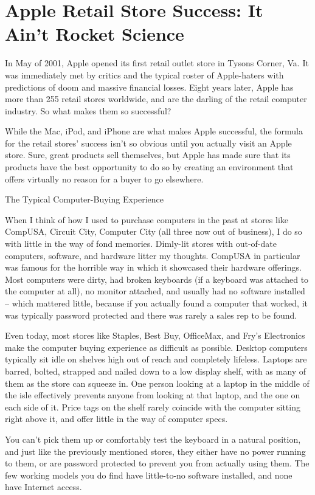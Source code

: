 ﻿\documentclass[12pt,a4paper,onecolumn]{article}
\begin{document}
\section{Apple Retail Store Success: It Ain't Rocket Science}

In May of 2001, Apple opened its first retail outlet store in Tysons Corner, Va. It was immediately
met by critics and the typical roster of Apple-haters with predictions of doom and massive financial
losses. Eight years later, Apple has more than 255 retail stores worldwide, and are the darling of
the retail computer industry. So what makes them so successful?

While the Mac, iPod, and iPhone are what makes Apple successful, the formula for the retail stores'
success isn't so obvious until you actually visit an Apple store. Sure, great products sell
themselves, but Apple has made sure that its products have the best opportunity to do so by creating
an environment that offers virtually no reason for a buyer to go elsewhere.

The Typical Computer-Buying Experience

When I think of how I used to purchase computers in the past at stores like CompUSA, Circuit City,
Computer City (all three now out of business), I do so with little in the way of fond memories.
Dimly-lit stores with out-of-date computers, software, and hardware litter my thoughts. CompUSA in
particular was famous for the horrible way in which it showcased their hardware offerings. Most
computers were dirty, had broken keyboards (if a keyboard was attached to the computer at all), no
monitor attached, and usually had no software installed -- which mattered little, because if you
actually found a computer that worked, it was typically password protected and there was rarely a
sales rep to be found.

Even today, most stores like Staples, Best Buy, OfficeMax, and Fry's Electronics make the computer
buying experience as difficult as possible. Desktop computers typically sit idle on shelves high out
of reach and completely lifeless. Laptops are barred, bolted, strapped and nailed down to a low
display shelf, with as many of them as the store can squeeze in. One person looking at a laptop in
the middle of the isle effectively prevents anyone from looking at that laptop, and the one on each
side of it. Price tags on the shelf rarely coincide with the computer sitting right above it, and
offer little in the way of computer specs.

You can't pick them up or comfortably test the keyboard in a natural position, and just like the
previously mentioned stores, they either have no power running to them, or are password protected to
prevent you from actually using them. The few working models you do find have little-to-no software
installed, and none have Internet access.
\end{document}
